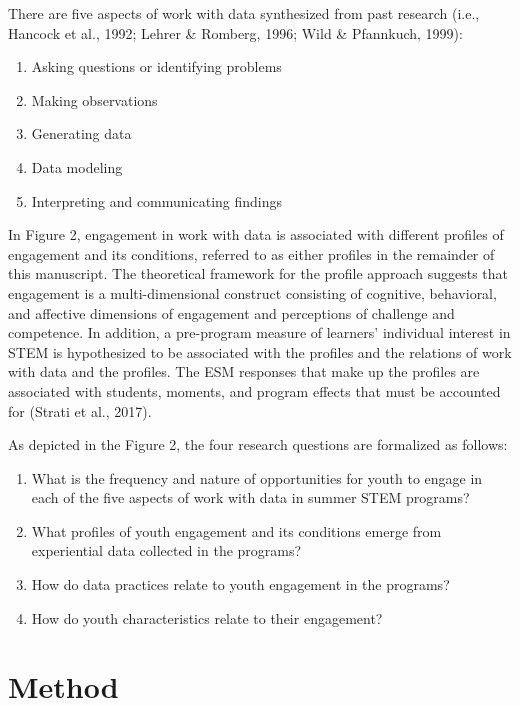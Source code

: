 \documentclass[]{msu-thesis}
\providecommand{\tightlist}{%
  \setlength{\itemsep}{0pt}\setlength{\parskip}{0pt}}
\theoremstyle{definition}
\theoremstyle{definition}
\theoremstyle{definition}
\theoremstyle{remark}
\begin{document}
There are five aspects of work with data synthesized from past research
(i.e., Hancock et al., 1992; Lehrer \& Romberg, 1996; Wild \& Pfannkuch,
1999):

\begin{enumerate}
\def\labelenumi{\arabic{enumi}.}
\tightlist
\item
  Asking questions or identifying problems
\item
  Making observations
\item
  Generating data
\item
  Data modeling
\item
  Interpreting and communicating findings
\end{enumerate}

In Figure 2, engagement in work with data is associated with different
profiles of engagement and its conditions, referred to as either
profiles in the remainder of this manuscript. The theoretical framework
for the profile approach suggests that engagement is a multi-dimensional
construct consisting of cognitive, behavioral, and affective dimensions
of engagement and perceptions of challenge and competence. In addition,
a pre-program measure of learners' individual interest in STEM is
hypothesized to be associated with the profiles and the relations of
work with data and the profiles. The ESM responses that make up the
profiles are associated with students, moments, and program effects that
must be accounted for (Strati et al., 2017).

As depicted in the Figure 2, the four research questions are formalized
as follows:

\begin{enumerate}
\def\labelenumi{\arabic{enumi}.}
\tightlist
\item
  What is the frequency and nature of opportunities for youth to engage
  in each of the five aspects of work with data in summer STEM programs?
\item
  What profiles of youth engagement and its conditions emerge from
  experiential data collected in the programs?
\item
  How do data practices relate to youth engagement in the programs?
\item
  How do youth characteristics relate to their engagement?
\end{enumerate}

\chapter{Method}\label{method}
\end{document}
